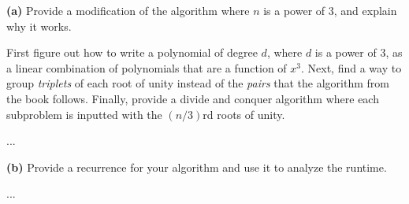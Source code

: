 \documentclass[12pt]{article}
\newcommand{\question}[3][Q]{
\begin{description}
\item \textbf{#1{#2}} #3
\end{description}
}
\newcommand{\hint}[1]{{\footnotesize
    \begin{description}
    [leftmargin=3.3em,style=nextline]
        \item[Hint:] {#1}
    \end{description}}   
}
\begin{document}
\setlength{\interspacetitleruled}{-.4pt}%
\begin{algorithm}[H]
\end{algorithm}


\question[]{(a)}{
    Provide a modification of the algorithm where $n$ is a power of 3, and explain why it works. 
}

    \hint{First figure out how to write a polynomial of degree $d$, where $d$ is a power of 3, as a linear combination of polynomials that are a function of $x^3$. Next, find a way to group \textit{triplets} of each root of unity instead of the \textit{pairs} that the algorithm from the book follows. Finally, provide a divide and conquer algorithm where each subproblem is inputted with the $(n/3)$rd roots of unity.}
\begin{answer}
    ...
\end{answer}


\question[]{(b)}{
    Provide a recurrence for your algorithm and use it to analyze the runtime.
}

\begin{answer}
    ...
\end{answer}
\end{document}
